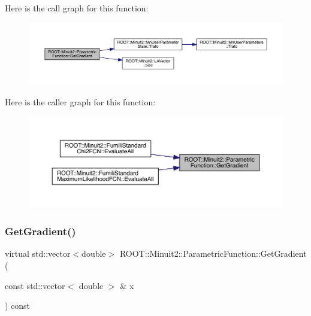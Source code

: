 Here is the call graph for this function\+:\nopagebreak
\begin{figure}[H]
\begin{center}
\leavevmode
\includegraphics[width=350pt]{d3/d76/classROOT_1_1Minuit2_1_1ParametricFunction_abe6cfa5c64c578101da1d6fcecfb2249_cgraph}
\end{center}
\end{figure}
Here is the caller graph for this function\+:\nopagebreak
\begin{figure}[H]
\begin{center}
\leavevmode
\includegraphics[width=350pt]{d3/d76/classROOT_1_1Minuit2_1_1ParametricFunction_abe6cfa5c64c578101da1d6fcecfb2249_icgraph}
\end{center}
\end{figure}
\mbox{\label{classROOT_1_1Minuit2_1_1ParametricFunction_a209b13474fae14c1e4a5523c6850c7ed}} 
\subsubsection{\texorpdfstring{GetGradient()}{GetGradient()}\hspace{0.1cm}{\footnotesize\ttfamily [2/2]}}
{\footnotesize\ttfamily virtual std\+::vector$<$double$>$ R\+O\+O\+T\+::\+Minuit2\+::\+Parametric\+Function\+::\+Get\+Gradient (\begin{DoxyParamCaption}\item[{const std\+::vector$<$ double $>$ \&}]{x }\end{DoxyParamCaption}) const\hspace{0.3cm}{\ttfamily [virtual]}}

